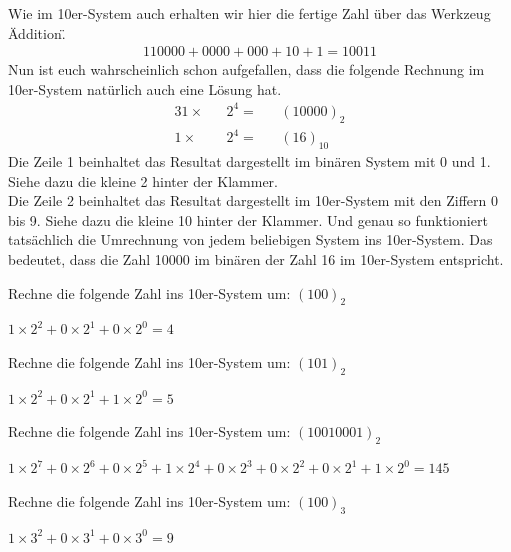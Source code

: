 Wie im 10er-System auch erhalten wir hier die fertige Zahl über das Werkzeug \"Addition\".
\begin{alignat*}{1}
    10000 + 0000 + 000 + 10 + 1 = 10011
\end{alignat*}
Nun ist euch wahrscheinlich schon aufgefallen, dass die folgende Rechnung im 10er-System natürlich auch eine Lösung hat.
\begin{alignat}{3}
    1 \times && 2^4 = && (10000)_2\\
    1 \times && 2^4 = && (16)_{10}
\end{alignat}
Die Zeile 1 beinhaltet das Resultat dargestellt im binären System mit 0 und 1. Siehe dazu die kleine 2 hinter der Klammer.\\
Die Zeile 2 beinhaltet das Resultat dargestellt im 10er-System mit den Ziffern 0 bis 9. Siehe dazu die kleine 10 hinter der Klammer.
Und genau so funktioniert tatsächlich die Umrechnung von jedem beliebigen System ins 10er-System.
Das bedeutet, dass die Zahl 10000 im binären der Zahl 16 im 10er-System entspricht.
\begin{exerciseseries}[columns=1,solsubrule=\hrule]{}
    \begin{exercise}
        Rechne die folgende Zahl ins 10er-System um: $(100)_2$\\
        \underline{\hspace{12cm}}
    \end{exercise}
    \begin{solution}
        $1 \times 2^2 + 0 \times 2^1 + 0 \times 2^0 = 4$
    \end{solution}

    \begin{exercise}
        Rechne die folgende Zahl ins 10er-System um: $(101)_2$\\
        \underline{\hspace{12cm}}
    \end{exercise}
    \begin{solution}
        $1 \times 2^2 + 0 \times 2^1 + 1 \times 2^0 = 5$
    \end{solution}

    \begin{exercise}
        Rechne die folgende Zahl ins 10er-System um: $(10010001)_2$\\
        \underline{\hspace{12cm}}
    \end{exercise}
    \begin{solution}
        $1 \times 2^7 + 0 \times 2^6 + 0 \times 2^5 + 1 \times 2^4 + 0 \times 2^3 + 0 \times 2^2 + 0 \times 2^1 + 1 \times 2^0 = 145$
    \end{solution}

    \begin{exercise}
        Rechne die folgende Zahl ins 10er-System um: $(100)_3$\\
        \underline{\hspace{12cm}}
    \end{exercise}
    \begin{solution}
        $1 \times 3^2 + 0 \times 3^1 + 0 \times 3^0 = 9$
    \end{solution}
\end{exerciseseries}
